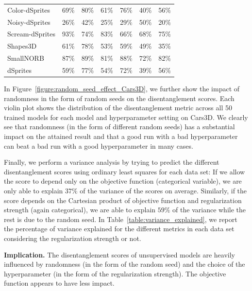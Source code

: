 \begin{table}
\begin{subtable}{\textwidth}
\begin{tabular}{lrrrrrr}
Color-dSprites  &            69\% &                  80\% &              61\% &  76\% &         40\% &  56\% \\
Noisy-dSprites  &            26\% &                  42\% &              25\% &  29\% &         50\% &  20\% \\
Scream-dSprites &            93\% &                  74\% &              83\% &  66\% &         68\% &  75\% \\
Shapes3D        &            61\% &                  78\% &              53\% &  59\% &         49\% &  35\% \\
SmallNORB       &            87\% &                  89\% &              81\% &  88\% &         72\% &  82\% \\
dSprites        &            59\% &                  77\% &              54\% &  72\% &         39\% &  56\% \\
\bottomrule
\end{tabular}
\label{table:variance_explained_with_reg}
\end{subtable}
\end{table}
In Figure~\ref{figure:random_seed_effect_Cars3D}, we further show the impact of randomness in the form of random seeds on the disentanglement scores.
Each violin plot shows the distribution of the disentanglement metric across all 50 trained models for each model and hyperparameter setting on Cars3D.
We clearly see that randomness (in the form of different random seeds) has a substantial impact on the attained result and that a good run with a bad hyperparameter can beat a bad run with a good hyperparameter in many cases.

Finally, we perform a variance analysis by trying to predict the different disentanglement scores using ordinary least squares for each data set:
If we allow the score to depend only on the objective function (categorical variable), we are only able to explain $37\%$ of the variance of the scores on average. 
Similarly, if the score depends on the Cartesian product of objective function and regularization strength (again categorical), we are able to explain $59\%$ of the variance while the rest is due to the random seed. In Table~\ref{table:variance_explained}, we report the percentage of variance explained for the different metrics in each data set considering the regularization strength or not. 

\textbf{Implication.} 
The disentanglement scores of unsupervised models are heavily influenced by randomness (in the form of the random seed) and the choice of the hyperparameter (in the form of the regularization strength). The objective function appears to have less impact.



